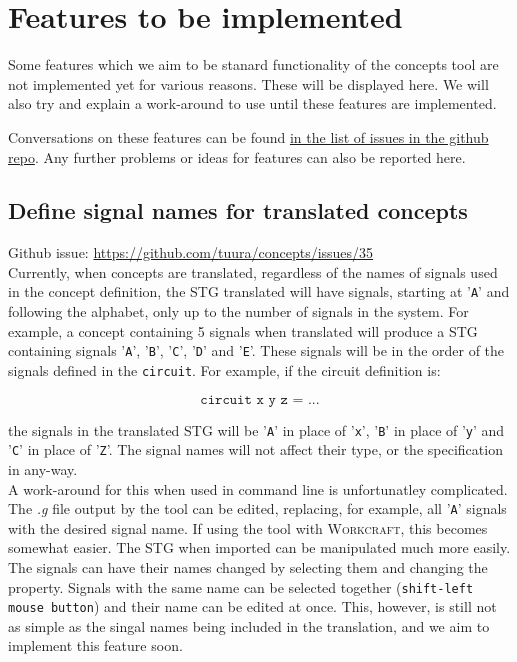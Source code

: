\documentclass{proc}
\newcommand{\noun}[1]{\textsc{#1}}
\begin{document}
\section{Features to be implemented \label{sec:to_be_implemented}}

Some features which we aim to be stanard functionality of the concepts tool are not implemented yet for various reasons. 
These will be displayed here. We will also try and explain a work-around to use until these features are implemented.

Conversations on these features can be found \href{https://github.com/tuura/concepts/issues}{in the list of issues in the github repo}. 
Any further problems or ideas for features can also be reported here.

\subsection*{Define signal names for translated concepts}

Github issue: \url{https://github.com/tuura/concepts/issues/35}\\

Currently, when concepts are translated, regardless of the names of signals used in the concept definition, the STG translated will have signals, starting at '\texttt{A}' and following the 
alphabet, only up to the number of signals in the system. For example, a concept containing 5 signals when translated will produce a STG containing signals '\texttt{A}', '\texttt{B}', 
'\texttt{C}', '\texttt{D}' and '\texttt{E}'. These signals will be in the order of the signals defined in the \texttt{circuit}. For example, if the circuit definition is:

  \[
  \texttt{circuit x y z = ...}
  \]

the signals in the translated STG will be '\texttt{A}' in place of '\texttt{x}', '\texttt{B}' in place of '\texttt{y}' and '\texttt{C}' in place of '\texttt{Z}'.  
The signal names will not affect their type, or the specification in any-way. \\

A work-around for this when used in command line is unfortunatley complicated. 
The \emph{.g} file output by the tool can be edited, replacing, for example, all '\texttt{A}' signals with the desired signal name.
If using the tool with \noun{Workcraft}, this becomes somewhat easier. The STG when imported can be manipulated much more easily. 
The signals can have their names changed by selecting them and changing the property. 
Signals with the same name can be selected together (\texttt{shift-left mouse button}) and their name can be edited at once. 
This, however, is still not as simple as the singal names being included in the translation, and we aim to implement this feature soon. 
\end{document}
